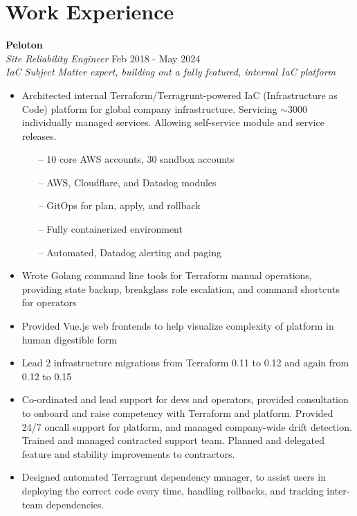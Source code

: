 \section{Work Experience}

\begin{minipage}{\textwidth}
  \large{\textbf{Peloton}} \\
  \textit{Site Reliability Engineer} \hfill Feb 2018 - May 2024 \\[3.75pt]
  \textit{IaC Subject Matter expert, building out a fully featured, internal IaC platform}
\end{minipage}

\begin{itemize}
  \item Architected internal Terraform/Terragrunt-powered IaC (Infrastructure as Code) platform for global company infrastructure. Servicing $\sim$3000 individually managed services. Allowing self-service module and service releases.
    \begin{itemize}
      \item[--] 10 core AWS accounts, 30 sandbox accounts
      \item[--] AWS, Cloudflare, and Datadog modules
      \item[--] GitOps for plan, apply, and rollback
      \item[--] Fully containerized environment
      \item[--] Automated, Datadog alerting and paging
    \end{itemize}
  \item Wrote Golang command line tools for Terraform manual operations, providing state backup, breakglass role escalation, and command shortcuts for operators
  \item Provided Vue.js web frontends to help visualize complexity of platform in human digestible form
  \item Lead 2 infrastructure migrations from Terraform 0.11 to 0.12 and again from 0.12 to 0.15
  \item Co-ordinated and lead support for devs and operators, provided consultation to onboard and raise competency with Terraform and platform. Provided 24/7 oncall support for platform, and managed company-wide drift detection. Trained and managed contracted support team. Planned and delegated feature and stability improvements to contractors.
  \item Designed automated Terragrunt dependency manager, to assist users in deploying the correct code every time, handling rollbacks, and tracking inter-team dependencies.

\end{itemize}
